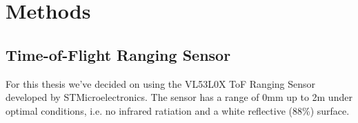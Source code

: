 \chapter{Methods}
\label{sec:evaluation}

\section{Time-of-Flight Ranging Sensor}
For this thesis we've decided on using the VL53L0X ToF Ranging Sensor developed by STMicroelectronics. The sensor has a range of 0\unit{mm} up to 2\unit{m} under optimal conditions, i.e. no infrared ratiation and a white reflective (88\%) surface. 